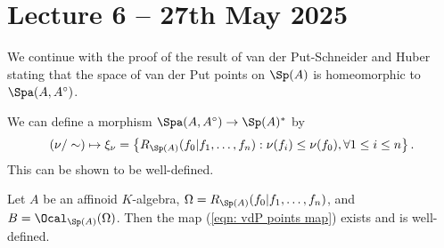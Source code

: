 \section{Lecture 6 -- 27th May 2025}\label{sec: lecture 6}
We continue with the proof of the result of van der Put-Schneider and Huber stating that the space of van der Put points on $\Sp(A)$ is homeomorphic to $\Spa(A,A^{\circ})$. 

We can define a morphism $\Spa(A,A^{\circ})\to \Sp(A)^{*}$ by 
\begin{equation}\label{eqn: vdP points map}
    (\nu/\sim)\mapsto\xi_{\nu}=\left\{R_{\Sp(A)}(f_{0}|f_{1},\dots,f_{n}):\nu(f_{i})\leq\nu(f_{0}),\forall 1\leq i\leq n\right\}.
\end{equation}
This can be shown to be well-defined. 
\begin{proposition}\label{prop: map from Spa exists}
    Let $A$ be an affinoid $K$-algebra, $\Omega=R_{\Sp(A)}(f_{0}|f_{1},\dots,f_{n})$, and $B=\Ocal_{\Sp(A)}(\Omega)$. Then the map (\ref{eqn: vdP points map}) exists and is well-defined. 
\end{proposition}

